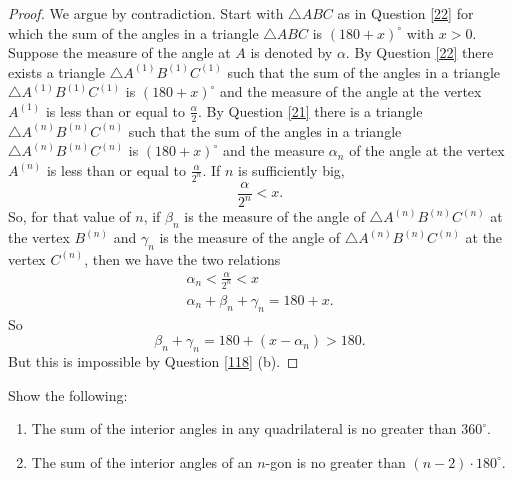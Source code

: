 \begin{proof}
We argue by contradiction. Start with $\triangle ABC$ as in Question \ref{22}
for which the sum of the angles in a triangle $\triangle ABC$ is $\left(
180+x\right)^\circ$ with $x>0$. Suppose the measure of the angle at $A$ is denoted by $\alpha$.
By Question \ref{22} there exists a triangle $\triangle A^{\left(  1\right)
}B^{\left(  1\right)  }C^{\left(  1\right)  }$ such that the sum of the angles
in a triangle $\triangle A^{\left(  1\right)  }B^{\left(  1\right)
}C^{\left(  1\right)  }$ is $\left(  180+x\right)^\circ$ and the measure of the angle at the vertex $A^{\left(  1\right)  }$ is less
than or equal to $\frac{\alpha}{2}$. By Question \ref{21} there is a triangle
$\triangle A^{\left(  n\right)  }B^{\left(  n\right)  }C^{\left(  n\right)  }$
such that the sum of the angles in a triangle $\triangle A^{\left(  n\right)
}B^{\left(  n\right)  }C^{\left(  n\right)  }$ is $\left(  180+x\right)^\circ$ and the measure $\alpha_{n}$ of the angle at the vertex $A^{\left(
n\right)  }$ is less than or equal to $\frac{\alpha}{2^{n}}$. If $n$ is
sufficiently big,%
\[
\frac{\alpha}{2^{n}}<x.
\]
So, for that value of $n$, if $\beta_{n}$ is the measure of the angle of
$\triangle A^{\left(  n\right)  }B^{\left(  n\right)  }C^{\left(  n\right)  }$
at the vertex $B^{\left(  n\right)  }$ and $\gamma_{n}$ is the measure of the
angle of $\triangle A^{\left(  n\right)  }B^{\left(  n\right)  }C^{\left(
n\right)  }$ at the vertex $C^{\left(  n\right)  }$, then we have the two
relations%
\begin{gather*}
\alpha_{n}<\frac{\alpha}{2^{n}}<x\\
\alpha_{n}+\beta_{n}+\gamma_{n}=180+x.
\end{gather*}
So%
\[
\beta_{n}+\gamma_{n}=180+\left(  x-\alpha_{n}\right)  >180.
\]
But this is impossible by Question \ref{118} (b).
\end{proof}

\begin{question}
Show the following:
\begin{enumerate}
\item The sum of the interior angles in any quadrilateral is no greater than $360^\circ$.
\item The sum of the interior angles of an $n$-gon is no greater than
$\left( n-2\right)\cdot180^\circ$.
\end{enumerate}
\end{question}
